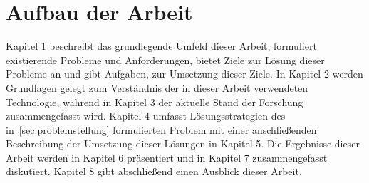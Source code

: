 \section{Aufbau der Arbeit}
Kapitel 1 beschreibt das grundlegende Umfeld dieser Arbeit, formuliert existierende Probleme und Anforderungen, bietet Ziele zur Lösung dieser Probleme an und gibt Aufgaben, zur Umsetzung dieser Ziele.
In Kapitel 2 werden Grundlagen gelegt zum Verständnis der in dieser Arbeit verwendeten Technologie, während in Kapitel 3 der aktuelle Stand der Forschung zusammengefasst wird.
Kapitel 4 umfasst Lösungsstrategien des in~\cref{sec:problemstellung} formulierten Problem mit einer anschließenden Beschreibung der Umsetzung dieser Lösungen in Kapitel 5.
Die Ergebnisse dieser Arbeit werden in Kapitel 6 präsentiert und in Kapitel 7 zusammengefasst diskutiert.
Kapitel 8 gibt abschließend einen Ausblick dieser Arbeit.

